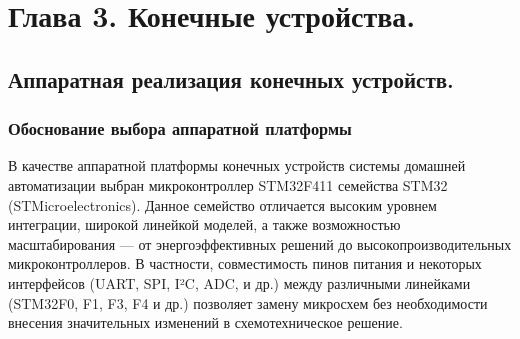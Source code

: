 \documentclass[14pt,a4paper]{extarticle}
\begin{document}
\newpage

\section{Глава 3. Конечные устройства.}

\subsection{Аппаратная реализация конечных устройств.}

\subsubsection{Обоснование выбора аппаратной платформы}

В качестве аппаратной платформы конечных устройств системы домашней автоматизации выбран микроконтроллер STM32F411 семейства STM32 (STMicroelectronics). Данное семейство отличается
высоким уровнем интеграции, широкой линейкой моделей, а также возможностью масштабирования — от энергоэффективных решений до высокопроизводительных микроконтроллеров. В частности,
совместимость пинов питания и некоторых интерфейсов (UART, SPI, I²C, ADC, и др.) между различными линейками (STM32F0, F1, F3, F4 и др.) позволяет замену микросхем без необходимости
внесения значительных изменений в схемотехническое решение.
\end{document}
